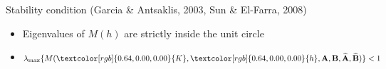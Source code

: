 \documentclass[compress,9pt,xcolor=svgnames]{beamer}
\newcommand{\bB}{\mathbf{B}}
\newcommand{\bBh}{\mathbf{\widehat{B}}}
\newcommand{\bA}{\mathbf{A}}
\newcommand{\bAh}{\mathbf{\widehat{A}}}
\begin{document}
{    \begin{block}{Stability condition {\scriptsize (Garcia \& Antsaklis, 2003, Sun \& El-Farra, 2008)}}
    \begin{itemize}
        \item Eigenvalues of $M(h)$ are strictly inside the unit circle
        \item $\lambda_{\max}\{M(\textcolor[rgb]{0.64,0.00,0.00}{K},\textcolor[rgb]{0.64,0.00,0.00}{h},\bA, \bB, \bAh, \bBh)\} < 1$
    \end{itemize}
    \vspace{0.5mm}
    \end{block}
}
\end{document}
